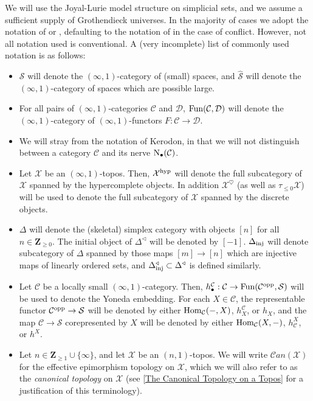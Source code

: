 \documentclass[10pt]{article}
\newcommand{\mS}{\mathcal S}
\newcommand{\C}{\mathcal C}
\newcommand{\cD}{\mathcal{D}}
\newcommand{\cX}{\mathcal{X}}
\newcommand{\ZZ}{\mathbb{Z}}
\def\ZZ{{\mathbf Z}}
\theoremstyle{witharg}
\theoremstyle{witharg}
\theoremstyle{witharg2}
\begin{document}
\noindent We will use the Joyal-Lurie model structure on simplicial sets, and we assume a sufficient supply of Grothendieck universes. In the majority of cases we adopt the notation of  or , defaulting to the notation of  in the case of conflict. However, not all notation used is conventional. A (very incomplete) list of commonly used notation is as follows: 

\begin{itemize}

    \item [$\bullet$] $\mS$ will denote the $(\infty,1)$-category of (small) spaces, and $\widehat{\mS}$ will denote the $(\infty,1)$-category of spaces which are possible large. 


    \item [$\bullet$] For all pairs of $(\infty,1)$-categories $\C$ and $\cD$, $\textnormal{Fun}(\C,\cD)$ will denote the $(\infty,1)$-category of $(\infty,1)$-functors $F:\C\rightarrow \cD$.

    \item [$\bullet$] We will stray from the notation of Kerodon, in that we will not distinguish between a category $\C$ and its nerve $\textnormal{N}_\bullet (\C)$. 
    


    \item [$\bullet$] Let $\cX$ be an $(\infty,1)$-topos. Then, $\cX^{\textnormal{hyp}}$ will denote the full subcategory of $\cX$ spanned by the hypercomplete objects. In addition $\cX^\heartsuit$ (as well as $\tau_{\leq 0}\cX$) will be used to denote the full subcategory of $\cX$ spanned by the discrete objects. 

    \item [$\bullet$] $\Delta$ will denote the (skeletal) simplex category with objects $[n]$ for all $n\in \ZZ_{\geq 0}$. The initial object of $\Delta^\triangleleft$ will be denoted by $[-1]$. $\Delta_{\textnormal{inj}}$ will denote subcategory of $\Delta$ spanned by those maps $[m]\rightarrow [n]$ which are injective maps of linearly ordered sets, and $\Delta^\triangleleft_{\textnormal{inj}}\subset \Delta^\triangleleft$ is defined similarly. 


    \item [$\bullet$] Let $\C$ be a locally small $(\infty,1)$-category. Then, $h^\C_\bullet:\C\rightarrow \textnormal{Fun}(\C^{\textnormal{opp}},\mS)$ will be used to denote the Yoneda embedding. For each $X\in \C$, the representable functor $\C^{\textnormal{opp}}\rightarrow \mS$ will be denoted by either $\textnormal{Hom}_\C(-,X)$, $h^\C_X$, or $h_X$, and the map $\C\rightarrow \mS$ corepresented by $X$ will be denoted by either $\textnormal{Hom}_\C(X,-)$, $h^X_\C$, or $h^X$. 

    \item [$\bullet$] Let $n\in \ZZ_{\geq 1}\cup \{\infty\}$, and let $\cX$ be an $(n,1)$-topos. We will write $\C an (\cX)$ for the effective epimorphism topology on $\cX$, which we will also refer to as the \emph{canonical topology} on $\cX$ (see \ref{The Canonical Topology on a Topos} for a justification of this terminology).


\end{itemize}
\end{document}
